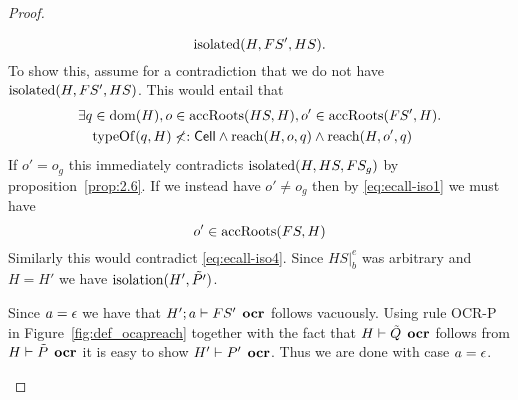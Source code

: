 \begin{proof}
\begin{description}
\begin{description}
\begin{equation}
            \mbox{$\mathrm{isolated}$}(H, FS', HS).
          \end{equation}
          To show this, assume for a contradiction that we do not have
          $\mbox{$\mathrm{isolated}$}(H, FS', HS)$. This would entail that
          \begin{equation}
            \begin{aligned}
              \exists q &\in \mbox{$\mathrm{dom}$}(H), o \in \mbox{$\mathrm{accRoots}$}(HS, H), o' \in
              \mbox{$\mathrm{accRoots}$}(FS', H) . \\
              &\mbox{$\mathrm{typeOf}$}(q, H) \not<: \mbox{$\mathsf{Cell}$} \land \mbox{$\mathrm{reach}$}(H, o, q) \land
              \mbox{$\mathrm{reach}$}(H, o', q)
            \end{aligned}
          \end{equation}
          If $o' = o_g$ this immediately contradicts $\mbox{$\mathrm{isolated}$}(H, HS, FS_g)$ by
          proposition~\ref{prop:2.6}. If we instead have $o' \neq o_g$ then by
          \eqref{eq:ecall-iso1} we must have
          \begin{equation}
            o' \in \mbox{$\mathrm{accRoots}$}(FS, H)
          \end{equation}
          Similarly this would contradict \eqref{eq:ecall-iso4}.  Since
          $HS|_b^e$ was arbitrary and $H = H'$ we have $\mbox{$\mathrm{isolation}$}(H',
          \tilde{P'})$.

          Since $a = \mbox{$\epsilon$}$ we have that $H'; a \vdash FS' \:\: \mbox{\bf ocr}$ follows
          vacuously.  Using rule {\sc OCR-P} in Figure~\ref{fig:def_ocapreach}
          together with the fact that $H \vdash \tilde{Q}\:\: \mbox{\bf ocr}$ follows
          from $H \vdash\tilde{P}\:\:\mbox{\bf ocr}$ it is easy to show $H' \vdash P'
          \:\: \mbox{\bf ocr}$.  Thus we are done with case $a = \mbox{$\epsilon$}$.
          

\end{description}
\end{description}
\end{proof}

